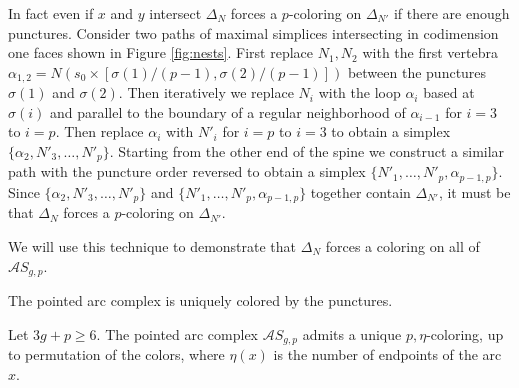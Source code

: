 \begin{example}
  In fact even if $x$ and $y$ intersect $\Delta_{N}$ forces a $p$-coloring on $\Delta_{N'}$ if there are enough punctures.
  Consider two paths of maximal simplices intersecting
  in codimension one faces shown in Figure \ref{fig:nests}.
  First replace $N_1,N_2$ with the first vertebra $\alpha_{1,2} =N( {s_0}\times[\sigma(1)/(p-1), \sigma(2)/(p-1)])$
  between the punctures $\sigma(1)$ and $\sigma(2)$.
  Then iteratively we replace $N_i$ with the loop $\alpha_i$ based at $\sigma(i)$ and parallel to the
  boundary of a regular neighborhood of $\alpha_{i-1}$ for $i=3$ to $i=p$.
  Then replace $\alpha_i$ with $N'_i$ for $i=p$ to $i=3$ to obtain a simplex $\{\alpha_2, N'_3,\ldots, N'_p\}$.
  Starting from the other end of the spine we construct a similar path with the puncture order reversed to obtain a simplex $\{N'_1, \ldots, N'_{p}, \alpha_{p-1,p}\}$.
  Since $\{\alpha_2, N'_3,\ldots, N'_p\}$ and $\{N'_1, \ldots, N'_{p}, \alpha_{p-1,p}\}$
  together contain $\Delta_{N'}$,
  it must be that $\Delta_{N}$ forces a $p$-coloring on $\Delta_{N'}$.

  We will use this technique to demonstrate that $\Delta_N$ forces a coloring on all of $\mathcal A S_{g,p}$.
\end{example}






\begin{lemma}
  The pointed arc complex is uniquely colored by the punctures.

  Let $3g+p\geq6$.
  The pointed arc complex $\mathcal A S_{g,p}$
  admits a
  unique
  $p,\eta$-coloring,
  up to permutation of the colors,
  where $\eta(x)$ is the number of endpoints of the arc $x$.
  \label{lemma:paint}
\end{lemma}

